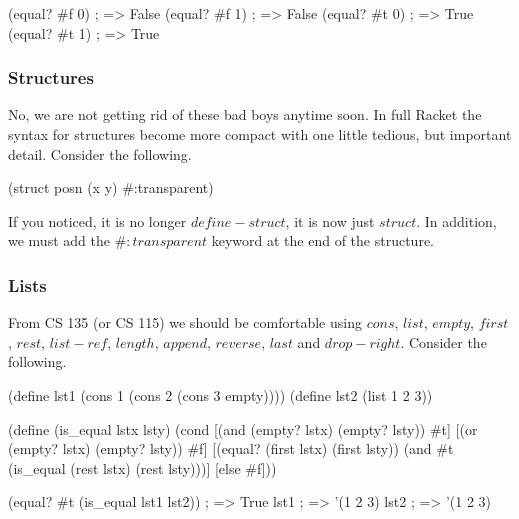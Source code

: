 \begin{code}[Lisp]
(equal? #f 0) ; => False
(equal? #f 1) ; => False
(equal? #t 0) ; => True
(equal? #t 1) ; => True
\end{code}

\subsubsection*{Structures}

No, we are not getting rid of these bad boys anytime soon. In full Racket the syntax for structures become more compact with one little tedious, but important detail. Consider the following.\\


\begin{code}[Lisp]
(struct posn (x y) #:transparent)
\end{code}

If you noticed, it is no longer $define-struct$, it is now just $struct$. In addition, we must add the $\#:transparent$ keyword at the end of the structure.\\


\subsubsection*{Lists}

From CS 135 (or CS 115) we should be comfortable using $cons$, $list$, $empty$, $first$, $rest$, $list-ref$, $length$, $append$, $reverse$, $last$ and $drop-right$. Consider the following.\\


\begin{code}[Lisp]
(define lst1 (cons 1 (cons 2 (cons 3 empty))))
(define lst2 (list 1 2 3))

(define (is_equal lstx lsty)
	(cond
		[(and (empty? lstx) (empty? lsty)) #t]
		[(or (empty? lstx) (empty? lsty)) #f]
		[(equal? (first lstx) (first lsty)) (and #t (is_equal (rest lstx)
		                                                      (rest lsty)))]
		[else #f]))
	
(equal? #t (is_equal lst1 lst2)) ; => True
lst1 ; => '(1 2 3)
lst2 ; => '(1 2 3)
\end{code}

